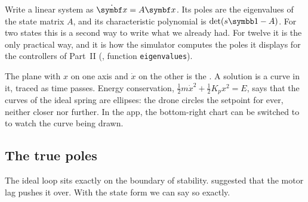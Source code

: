 \begin{result}
Write a linear system as $\dot{\vx} = A\vx$. Its poles are the eigenvalues of the state matrix $A$, and its characteristic polynomial is $\det(s\Id - A)$. For two states this is a second way to write what we already had. For twelve it is the only practical way, and it is how the simulator computes the poles it displays for the controllers of Part~II (, function \texttt{eigenvalues}).
\end{result}

The plane with $x$ on one axis and $\dot x$ on the other is the . A solution is a curve in it, traced as time passes. Energy conservation, $\tfrac12 m\dot x^2 + \tfrac12 K_p x^2 = E$, says that the curves of the ideal spring are ellipses: the drone circles the setpoint for ever, neither closer nor further. In the app, the bottom-right chart can be switched to  to watch the curve being drawn.

\subsection{The true poles}
The ideal loop sits exactly on the boundary of stability.  suggested that the motor lag pushes it over. With the state form we can say so exactly.

